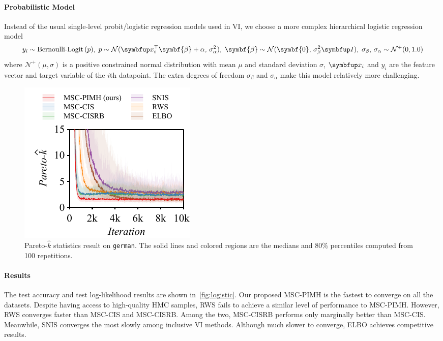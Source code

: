 \vspace{-0.1in}
\paragraph{Probabilistic Model}
Instead of the usual single-level probit/logistic regression models used in VI, we choose a more complex hierarchical logistic regression model 
%
\begin{equation}
y_i \sim \text{Bernoulli-Logit}\,(p),\;
p \sim \mathcal{N}(\vx_i^{\top}\symbf{\beta} + \alpha,\, \sigma_{\alpha}^2),\;
\symbf{\beta} \sim \mathcal{N}(\symbf{0},\, \sigma_{\beta}^2 \mI),\;
\sigma_{\beta},\,\sigma_{\alpha} \sim \mathcal{N}^{+}(0, 1.0)
\end{equation}
%
where \(\mathcal{N}^+(\mu, \sigma)\) is a positive constrained normal distribution with mean \(\mu\) and standard deviation \(\sigma\), \(\vx_i\) and \(y_i\) are the feature vector and target variable of the \(i\)th datapoint.
The extra degrees of freedom \(\sigma_{\beta}\) and \(\sigma_{\alpha}\) make this model relatively more challenging.

%
\begin{figure}
  \vspace{-0.3in}
  \includegraphics[scale=0.75]{figures/german_01.pdf}
  \caption{Pareto-\(\widehat{k}\) statistics result on \texttt{german}.
    The solid lines and colored regions are the medians and 80\% percentiles computed from 100 repetitions.
    }\label{fig:paretok}
  \vspace{-0.2in}
\end{figure}
%
\vspace{-0.1in}
\paragraph{Results}
The test accuracy and test log-likelihood results are shown in~\cref{fig:logistic}.
Our proposed MSC-PIMH is the fastest to converge on all the datasets.
Despite having access to high-quality HMC samples, RWS fails to achieve a similar level of performance to MSC-PIMH.
However, RWS converges faster than MSC-CIS and MSC-CISRB.
Among the two, MSC-CISRB performs only marginally better than MSC-CIS.
Meanwhile, SNIS converges the most slowly among inclusive VI methods.
Although much slower to converge, ELBO achieves competitive results.

